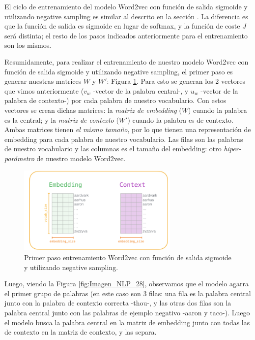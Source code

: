\documentclass[12pt,a4paper]{article}
\begin{document}
\begin{sloppypar}
El ciclo de entrenamiento del modelo Word2vec con función de salida sigmoide y utilizando negative sampling es similar al descrito en la sección \textit{}. La diferencia es que la función de salida es sigmoide en lugar de softmax, y la función de coste $J$ será distinta; el resto de los pasos indicados anteriormente para el entrenamiento son los mismos.

Resumidamente, para realizar el entrenamiento de nuestro modelo Word2vec con función de salida sigmoide y utilizando negative sampling, el primer paso es generar nuestras matrices $W$ y $W'$: Figura \ref{fig:Imagen_NLP_27}. Para esto se generan los 2 vectores que vimos anteriormente ($v_w$ -vector de la palabra central-, y $u_w$ -vector de la palabra de contexto-) por cada palabra de nuestro vocabulario. Con estos vectores se crean dichas matrices: la \textit{matriz de embedding} ($W$) cuando la palabra es la central; y la \textit{matriz de contexto} ($W'$) cuando la palabra es de contexto. Ambas matrices tienen \textit{el mismo tamaño}, por lo que tienen una representación de embedding para cada palabra de nuestro vocabulario. Las filas son las palabras de nuestro vocabulario y las columnas es el tamaño del embedding: otro \textit{hiper-parámetro} de nuestro modelo Word2vec.

\begin{figure}[H]    
 \centering
 \includegraphics[width=0.7\textwidth]{images/NLP/27.png}
 \captionsetup{justification=centering,margin=2cm}
 \caption{Primer paso entrenamiento Word2vec con función de salida sigmoide y utilizando negative sampling\cite{datitos_nlp}.}
 \label{fig:Imagen_NLP_27}
\end{figure}

Luego, viendo la Figura \ref{fig:Imagen_NLP_28}, observamos que el modelo agarra el primer grupo de palabras (en este caso son 3 filas: una fila es la palabra central junto con la palabra de contexto correcta -thou-, y las otras dos filas son la palabra central junto con las palabras de ejemplo negativo -aaron y taco-). Luego el modelo busca la palabra central en la matriz de embedding junto con todas las de contexto en la matriz de contexto, y las separa. 


\end{sloppypar}
\end{document}
